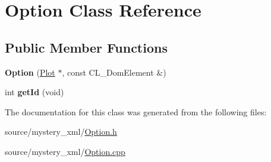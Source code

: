 \hypertarget{classOption}{
\section{Option Class Reference}
\label{classOption}
}
\subsection*{Public Member Functions}
\begin{DoxyCompactItemize}
\item 
\hypertarget{classOption_a3cd7af3fd09c247d01e6725e24a91ea2}{
{\bfseries Option} (\hyperlink{classPlot}{Plot} $\ast$, const CL\_\-DomElement \&)}
\label{classOption_a3cd7af3fd09c247d01e6725e24a91ea2}

\item 
\hypertarget{classOption_aa4598f77bf8564c48e3e7b82cd06ed7f}{
int {\bfseries getId} (void)}
\label{classOption_aa4598f77bf8564c48e3e7b82cd06ed7f}

\end{DoxyCompactItemize}


The documentation for this class was generated from the following files:\begin{DoxyCompactItemize}
\item 
source/mystery\_\-xml/\hyperlink{Option_8h}{Option.h}\item 
source/mystery\_\-xml/\hyperlink{Option_8cpp}{Option.cpp}\end{DoxyCompactItemize}
